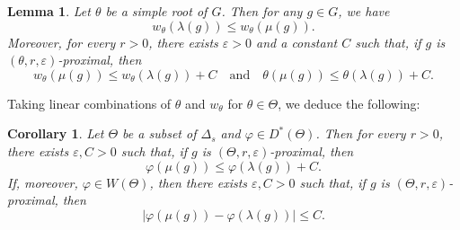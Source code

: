 \documentclass[JEP,XML,SOM,Unicode,NoEqCountersInSection,NoFloatCountersInSection,published]{cedram}
\newcommand{\quand}{\quad\text{and}\quad}
\newtheorem{coro}[theo]{Corollary}
\newtheorem{lemma}[theo]{Lemma}
\theoremstyle{definition}
\let\epsilon\varepsilon
\let\phi\varphi
\begin{document}
\begin{lemma} \label{lem - ComparisonMuLambdaProximalElement}
Let $\theta$ be a simple root of $G$. Then for any $g\in G$, we have
\[w_\theta(\lambda(g)) \leq w_\theta(\mu(g)).\]
Moreover, for every $r>0$, there exists $\epsilon >0$ and a constant $C$ such that, if $g$ is $(\theta,r,\epsilon)$-proximal, then
\[w_\theta(\mu(g)) \leq w_\theta(\lambda(g)) + C\quand
\theta(\mu(g)) \leq \theta(\lambda(g)) + C.\]
\end{lemma}
Taking linear combinations of $\theta$ and $w_\theta$ for $\theta \in \Theta$, we deduce the following:
\begin{coro} \label{coro - ComparisonMuLambdaProximalElement}
Let $\Theta$ be a subset of $\Delta_s$ and $\phi \in D^*(\Theta)$. Then for every $r>0$, there exists $\epsilon, C>0$ such that, if $g$ is $(\Theta,r,\epsilon)$-proximal, then
\[\phi(\mu(g)) \leq \phi(\lambda(g)) + C.\]
If, moreover, $\phi \in W(\Theta)$, then there exists $\epsilon, C>0$ such that, if $g$ is $(\Theta,r,\epsilon)$-proximal, then
\[\vert \phi(\mu(g)) -\phi(\lambda(g))\vert \leq C.\]
\end{coro}
\end{document}
